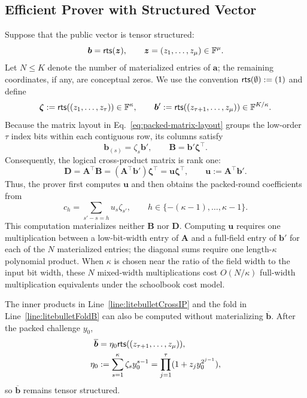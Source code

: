 \subsection{Efficient Prover with Structured Vector}
\label{sec:litebulletAccelleration}
Suppose that the public vector is tensor structured:
\[
    \bm b={\sf rts}(\bm z),
    \qquad
    \bm z=(z_1,\ldots,z_\mu)\in{\mathbb{F}}^\mu.
\]
Let $N\le K$ denote the number of materialized entries of $\bm a$; the
remaining coordinates, if any, are conceptual zeros.  We use the convention
${\sf rts}(\emptyset):=(1)$ and define
\[
    \bm\zeta:={\sf rts}((z_1,\ldots,z_\tau))\in{\mathbb{F}}^\kappa,
    \qquad
    \bm b':={\sf rts}((z_{\tau+1},\ldots,z_\mu))
       \in{\mathbb{F}}^{K/\kappa}.
\]
Because the matrix layout in Eq.~\eqref{eq:packed-matrix-layout} groups the
low-order $\tau$ index bits within each contiguous row, its columns satisfy
\[
    \bm b_{(s)}=\zeta_s\bm b',
    \qquad
    \bm B=\bm b'\bm\zeta^\top.
\]
Consequently, the logical cross-product matrix is rank one:
\begin{equation}
\label{eq:structured-cross-product}
    \bm D
    =\bm A^\top\bm B
    =(\bm A^\top\bm b')\bm\zeta^\top
    =\bm u\bm\zeta^\top,
    \qquad
    \bm u:=\bm A^\top\bm b'.
\end{equation}
Thus, the prover first computes $\bm u$ and then obtains the packed-round
coefficients from
\[
    c_h=\sum_{s'-s=h}u_s\zeta_{s'},
    \qquad h\in\{-(\kappa-1),\ldots,\kappa-1\}.
\]
This computation materializes neither $\bm B$ nor $\bm D$.  Computing
$\bm u$ requires one multiplication between a low-bit-width entry of $\bm A$
and a full-field entry of $\bm b'$ for each of the $N$ materialized entries;
the diagonal sums require one length-$\kappa$ polynomial product.  When
$\kappa$ is chosen near the ratio of the field width to the input bit width,
these $N$ mixed-width multiplications cost $O(N/\kappa)$ full-width
multiplication equivalents under the schoolbook cost model.

The inner products in Line~\ref{line:litebulletCrossIP} and the fold in
Line~\ref{line:litebulletFoldB} can also be computed without materializing
$\overline{\bm b}$.  After the packed challenge $y_0$,
\begin{align}
\label{eq:structured-packed-fold}
    \overline{\bm b}
    &=\eta_0{\sf rts}((z_{\tau+1},\ldots,z_\mu)), \\
    \eta_0
    &:=\sum_{s=1}^{\kappa}\zeta_sy_0^{s-1}
      =\prod_{j=1}^{\tau}(1+z_jy_0^{2^{j-1}}),
\end{align}
so $\overline{\bm b}$ remains tensor structured.

